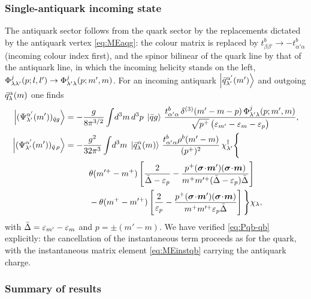 \subsubsection{Single-antiquark incoming state}

The antiquark sector follows from the quark sector by the replacements dictated by the
antiquark vertex \eqref{eq:MEaqg}: the colour matrix is replaced by
$t^{b}_{\beta\beta'}\to-t^{b}_{\alpha'\alpha}$ (incoming colour index first), and the spinor
bilinear of the quark line by that of the antiquark line, in which the incoming helicity stands
on the left, $\Phi^{j}_{\lambda\lambda'}(p;l,l')\to\Phi^{j}_{\lambda'\lambda}(p;m',m)$. For an incoming
antiquark $\left|\bar q^{\alpha'}_{\lambda'}(m')\right\rangle$ and outgoing $\bar q^{\alpha}_{\lambda}(m)$ one finds
\begin{align}
\ket{(\Psi^{\alpha'}_{\lambda'}(m'))_{\bar qg}}&=-\frac{g}{8\pi^{3/2}}\int\!d^{3}m\,d^{3}p\;\ket{\bar q g}\,
\frac{t^{b}_{\alpha'\alpha}\,\dthree(m'-m-p)\,\Ph^{j}_{\lambda'\lambda}(p;m',m)}{\sqrt{p^{+}}\,\big(\eps_{m'}-\eps_{m}-\eps_{p}\big)},
\label{eq:Pqb-qbg}\\
\ket{(\Psi^{\alpha'}_{\lambda'}(m'))_{\bar q\,\rho}}&=-\frac{g^{2}}{32\pi^{3}}\int\!d^{3}m\;\ket{\aqk{\alpha}{\lambda}{m}}\,
\frac{t^{b}_{\alpha'\alpha}\rho^{b}(m'-m)}{(p^{+})^{2}}\,\chi^{\dg}_{\lambda'}\Bigg\{
\nonumber\\&\hspace{1.0cm}
\theta(m'^{+}-m^{+})\left[\frac{2}{\bar\Delta-\eps_{p}}
-\frac{p^{+}(\bm\sigma\!\cdot\!\bm m')(\bm\sigma\!\cdot\!\bm m)}{m^{+}m'^{+}(\bar\Delta-\eps_{p})\bar\Delta}\right]
\nonumber\\
&\hspace{1.0cm}-\theta(m^{+}-m'^{+})\left[\frac{2}{\eps_{p}}
-\frac{p^{+}(\bm\sigma\!\cdot\!\bm m')(\bm\sigma\!\cdot\!\bm m)}{m^{+}m'^{+}\eps_{p}\bar\Delta}\right]\Bigg\}\chi_{\lambda},
\label{eq:Pqb-qb}
\end{align}
with $\bar\Delta=\varepsilon_{m'}-\varepsilon_{m}$ and $p=\pm(m'-m)$. We have verified \eqref{eq:Pqb-qb}
explicitly: the cancellation of the instantaneous term proceeds as for the quark, with the
instantaneous matrix element \eqref{eq:MEinstqb} carrying the antiquark charge.

\subsubsection{Summary of results}
\label{sec:sum-q}

